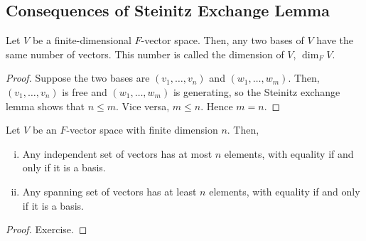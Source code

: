 \subsection{Consequences of Steinitz Exchange Lemma}
\begin{corollary}
Let \( V \) be a finite-dimensional \( F \)-vector space.
Then, any two bases of \( V \) have the same number of vectors.
This number is called the dimension of \( V \), \( \dim_F V \).
\end{corollary}
\begin{proof}
Suppose the two bases are \( (v_1, \dots, v_n) \) and \( (w_1, \dots, w_m) \).
Then, \( (v_1, \dots, v_n) \) is free and \( (w_1, \dots, w_m) \) is generating, so the Steinitz exchange lemma shows that \( n \leq m \).
Vice versa, \( m \leq n \).
Hence \( m = n \).
\end{proof}
\begin{corollary}
Let \( V \) be an \( F \)-vector space with finite dimension \( n \).
Then,
\begin{enumerate}[(i)]
\item Any independent set of vectors has at most \( n \) elements, with equality if and only if it is a basis.
\item Any spanning set of vectors has at least \( n \) elements, with equality if and only if it is a basis.
\end{enumerate}
\end{corollary}
\begin{proof}
Exercise.
\end{proof}

